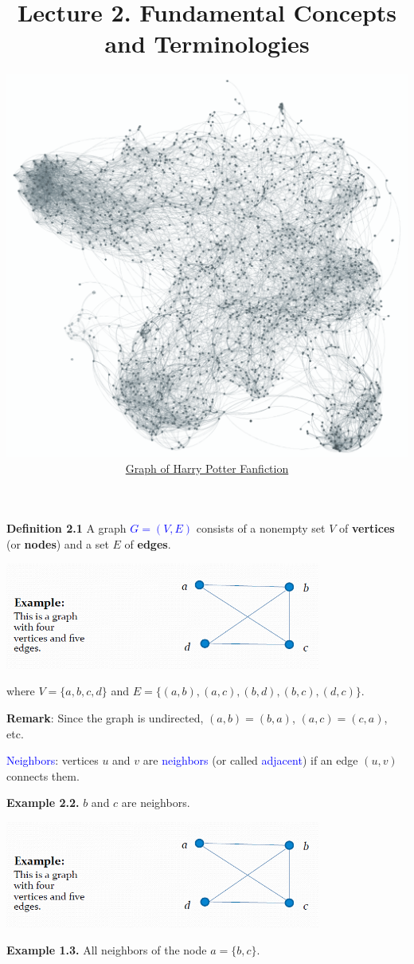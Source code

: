 \documentclass[aspectratio=169]{beamer}
\title{Lecture 2. Fundamental Concepts and Terminologies}
\author{\includegraphics[width=.5\textwidth,height=.7\textheight]{./img/lecture2-fig0.png} \\
   \href{https://colah.github.io/posts/2014-07-FFN-Graphs-Vis/}{Graph of Harry Potter Fanfiction}
 }
\date{  }
\providecommand{\Blue}[1]{\textcolor{blue}{#1}}
\begin{document}
\frame[plain]{\titlepage}


\begin{frame}[plain]{}
 
 {\bf Definition 2.1} A graph \Blue{$G = (V, E)$} consists of a nonempty set $V$ of {\bf vertices}
    (or {\bf nodes}) and a set $E$ of {\bf edges}.
    \begin{center}
      \includegraphics[height=3.5cm]{./img/lecture2-fig1.png}
    \end{center}
where $V = \{ a, b, c, d\}$ and $E = \{ (a,b), (a,c), (b,d), (b,c), (d,c)\} $. \\
\medskip

{\bf Remark}: Since the graph is undirected, $(a,b) = (b,a)$, $(a,c)=(c,a)$, etc.

\end{frame}

\begin{frame}[plain]{}

\Blue{Neighbors}: vertices $u$ and $v$ are \Blue{neighbors} (or called \Blue{adjacent})
 if an edge $(u,v)$ connects them.
\medskip

{\bf Example 2.2.}  $b$ and $c$ are neighbors.
 \begin{center}
      \includegraphics[height=3.5cm]{./img/lecture2-fig1.png}
    \end{center}
    
 {\bf Example 1.3.}  All neighbors of the node $a = \{ b, c\}$.
\end{frame}
\end{document}
